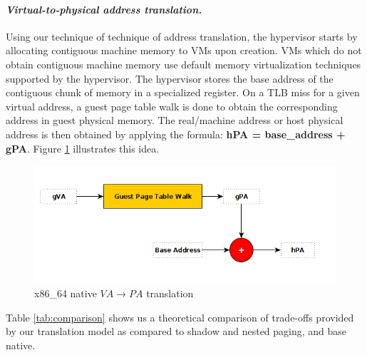 \documentclass[sigconf]{sigplanconf}
\begin{document}
  \paragraph{ \textit{Virtual-to-physical address translation.} 
  	} Using our technique of technique of address translation, the hypervisor starts by allocating contiguous machine memory to VMs upon creation. VMs which do not obtain contiguous machine memory use default memory virtualization techniques supported by the hypervisor. The hypervisor stores the base address of the contiguous chunk of memory in a specialized register. On a TLB miss for a given virtual address, a guest page table walk is done to obtain the corresponding address in guest physical memory. The real/machine address or host physical address is then obtained by applying the formula: \textbf{ hPA = base\_address + gPA}. Figure \ref{fig:summary} illustrates this idea.
  	 	
  	\begin{figure}[!h]
  		\centering 
  		\includegraphics[scale=0.35]{mecanism.png}
  		\caption{x86\_64 native $VA \rightarrow PA$ translation}
  		\label{fig:summary}
  	\end{figure}
  	
  	Table \ref{tab:comparison} shows us a theoretical comparison of trade-offs provided by our translation model as compared to shadow and nested paging, and base native.
  	
\end{document}
